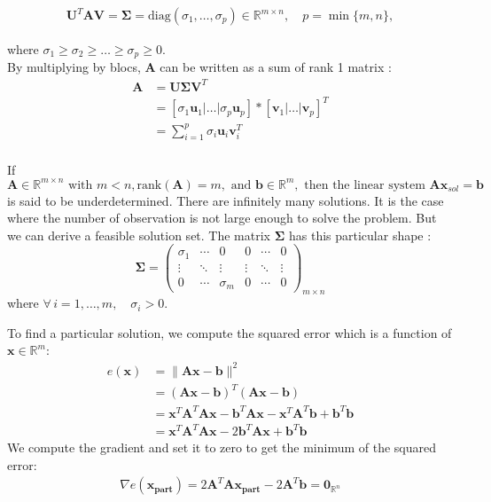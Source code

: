 \documentclass{article}
\begin{document}
\begin{align*}
\mathbf{U}^T \mathbf{A} \mathbf{V} = \boldsymbol{\Sigma} = \text{diag}(\sigma_1, \dots, \sigma_p) \in \mathbb{R}^{m \times n}, \quad p = \min\{m,n\},
\end{align*}

where $\sigma_1 \geq \sigma_2 \geq \dots \geq \sigma_p \geq 0$.\\

By multiplying by blocs, $ \mathbf{A} $ can be written as a sum of rank 1 matrix :\\
\begin{align*}
\mathbf{A} &= \mathbf{U}  \boldsymbol{\Sigma} \mathbf{V}^T \\
&= [\sigma_1\mathbf{u}_1 | \dots | \sigma_p \mathbf{u}_p]*[\mathbf{v}_1 | \dots | \mathbf{v}_p]^T\\
&=\sum_{i=1}^p \sigma_i \mathbf{u}_i \mathbf{v}_i^T  \\
\end{align*}

If $\mathbf{A} \in \mathbb{R}^{m \times n} \text{ with } m < n, \text{rank}(\mathbf{A}) = m, \text{ and } \mathbf{b} \in \mathbb{R}^m, \text{ then the linear system } \mathbf{A} \mathbf{x}_{sol} = \mathbf{b}$ is said to be underdetermined. There are infinitely many solutions. It is the case where the number of observation is not large enough to solve the problem. But we can derive a feasible solution set. The matrix $\boldsymbol{\Sigma}$ has this particular shape :  
\[
\boldsymbol{\Sigma} =
\begin{pmatrix}
\sigma_{1} & \cdots & 0 & 0 & \cdots & 0 \\
\vdots & \ddots & \vdots & \vdots & \ddots & \vdots \\
0 & \cdots & \sigma_{m} & 0 & \cdots & 0
\end{pmatrix}_{m \times n}
\]
where $\forall \, i = 1, \dots, m, \quad \sigma_i > 0$.

To find a particular solution, we compute the squared error which is a function of $\mathbf{x} \in \mathbb{R}^{m}$:
\begin{align*}
e(\mathbf{x}) &=\|\mathbf{A}\mathbf{x} - \mathbf{b}\|^2 \\
&= (\mathbf{A}\mathbf{x} - \mathbf{b})^T (\mathbf{A}\mathbf{x} - \mathbf{b})\\
&= \mathbf{x}^T \mathbf{A}^T \mathbf{A} \mathbf{x} - \mathbf{b}^T \mathbf{A} \mathbf{x} - \mathbf{x}^T \mathbf{A}^T \mathbf{b} + \mathbf{b}^T \mathbf{b}\\
&= \mathbf{x}^T \mathbf{A}^T \mathbf{A} \mathbf{x} - 2 \mathbf{b}^T \mathbf{A} \mathbf{x} + \mathbf{b}^T \mathbf{b}
\end{align*}
We compute the gradient and set it to zero to get the minimum of the squared error:
\begin{align*}
\nabla e(\mathbf{x_{part}}) = 2 \mathbf{A}^T \mathbf{A} \mathbf{x_{part}} - 2 \mathbf{A}^T \mathbf{b} = \mathbf{0}_{  \mathbb{R}^{n} }
\end{align*}
\end{document}
